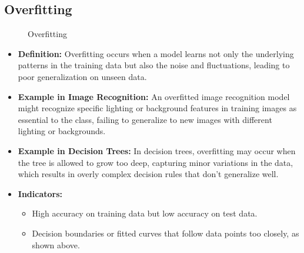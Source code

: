 \documentclass{article}
\begin{document}
\subsection{Overfitting}
	\begin{figure}[H]
		\begin{center}
			\caption{Overfitting}
		\end{center}
	\end{figure}
 \begin{itemize}
    \item \textbf{Definition:} Overfitting occurs when a model learns not only the underlying patterns in the training data but also the noise and fluctuations, leading to poor generalization on unseen data.
    \item \textbf{Example in Image Recognition:} An overfitted image recognition model might recognize specific lighting or background features in training images as essential to the class, failing to generalize to new images with different lighting or backgrounds.
    \item \textbf{Example in Decision Trees:} In decision trees, overfitting may occur when the tree is allowed to grow too deep, capturing minor variations in the data, which results in overly complex decision rules that don’t generalize well.
    \item \textbf{Indicators:}
        \begin{itemize}
            \item High accuracy on training data but low accuracy on test data.
            \item Decision boundaries or fitted curves that follow data points too closely, as shown above.
        \end{itemize}
\end{itemize}
\end{document}
